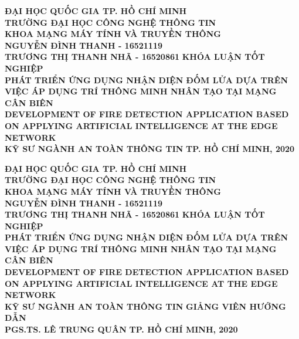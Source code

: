 \begin{titlepage}
\begin{center}
{\large\bf ĐẠI HỌC QUỐC GIA TP. HỒ CHÍ MINH} \\
{\large\bf TRƯỜNG ĐẠI HỌC CÔNG NGHỆ THÔNG TIN}\\
{\Large\bf KHOA MẠNG MÁY TÍNH VÀ TRUYỀN THÔNG}\\[0.25cm]
\vskip 2.5cm
{\bf\large NGUYỄN ĐÌNH THANH - 16521119}\\
{\bf\large TRƯƠNG THỊ THANH NHÃ - 16520861}
\vskip 2.5cm
{\bf\Large KHÓA LUẬN TỐT NGHIỆP}\\[0.5cm]
{\LARGE\textbf{PHÁT TRIỂN ỨNG DỤNG NHẬN DIỆN ĐỐM LỬA DỰA TRÊN VIỆC ÁP DỤNG TRÍ THÔNG MINH NHÂN TẠO TẠI MẠNG CÂN BIÊN}}\\[0.5cm]
{\bf\Large\color{red} DEVELOPMENT OF FIRE DETECTION APPLICATION BASED ON APPLYING ARTIFICIAL INTELLIGENCE AT THE EDGE NETWORK}\\
\vskip 2.0cm
{\bf\large KỸ SƯ NGÀNH AN TOÀN THÔNG TIN}
\vfill
{\bf TP. HỒ CHÍ MINH, 2020}
\end{center}
\end{titlepage}

\thisfancypage{\setlength{\fboxsep}{10pt}\fbox}{}  %

\begin{titlepage}
\begin{center}
{\large\bf ĐẠI HỌC QUỐC GIA TP. HỒ CHÍ MINH} \\
{\large\bf TRƯỜNG ĐẠI HỌC CÔNG NGHỆ THÔNG TIN}\\
{\Large\bf KHOA MẠNG MÁY TÍNH VÀ TRUYỀN THÔNG}\\[0.25cm]
\vskip 2.5cm
{\bf\large NGUYỄN ĐÌNH THANH - 16521119}\\
{\bf\large TRƯƠNG THỊ THANH NHÃ - 16520861}
\vskip 2.5cm
{\bf\Large KHÓA LUẬN TỐT NGHIỆP}\\[0.5cm]
{\LARGE\textbf{PHÁT TRIỂN ỨNG DỤNG NHẬN DIỆN ĐỐM LỬA DỰA TRÊN VIỆC ÁP DỤNG TRÍ THÔNG MINH NHÂN TẠO TẠI MẠNG CÂN BIÊN}}\\[0.5cm]
{\bf\Large\color{red} DEVELOPMENT OF FIRE DETECTION APPLICATION BASED ON APPLYING ARTIFICIAL INTELLIGENCE AT THE EDGE NETWORK}\\
\vskip 2.0cm
{\bf\large KỸ SƯ NGÀNH AN TOÀN THÔNG TIN}
\vskip 1.0cm
{\bf\large GIẢNG VIÊN HƯỚNG DẪN}\\[0.20cm]
{\bf\large PGS.TS. LÊ TRUNG QUÂN}
\vfill
{\bf TP. HỒ CHÍ MINH, 2020}
\end{center}
\end{titlepage}